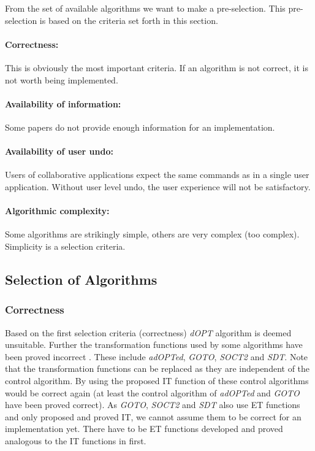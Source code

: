 From the set of available algorithms we want to make a pre-selection. This pre-selection is based on the criteria set forth in this section.

\paragraph{Correctness:} This is obviously the most important criteria. If an algorithm is not correct, it is not worth being implemented.

\paragraph{Availability of information:} Some papers do not provide enough information for an implementation.

\paragraph{Availability of user undo:} Users of collaborative applications expect the same commands as in a single user application. Without user level undo, the user experience will not be satisfactory.

\paragraph{Algorithmic complexity:} Some algorithms are strikingly simple, others are very complex (too complex). Simplicity is a selection criteria.


\subsection{Selection of Algorithms}

\subsubsection{Correctness}
Based on the first selection criteria (correctness) \emph{dOPT} algorithm is deemed unsuitable. Further the transformation functions used by some algorithms have been proved incorrect \cite{imine04}. These include \emph{adOPTed}, \emph{GOTO}, \emph{SOCT2} and \emph{SDT}. Note that the transformation functions can be replaced as they are independent of the control algorithm. By using the proposed IT function of \cite{imine04} these control algorithms would be correct again (at least the control algorithm of \emph{adOPTed} and \emph{GOTO} have been proved correct). As \emph{GOTO}, \emph{SOCT2} and \emph{SDT} also use ET functions and \cite{imine04} only proposed and proved IT, we cannot assume them to be correct for an implementation yet. There have to be ET functions developed and proved analogous to the IT functions in \cite{imine04} first.

